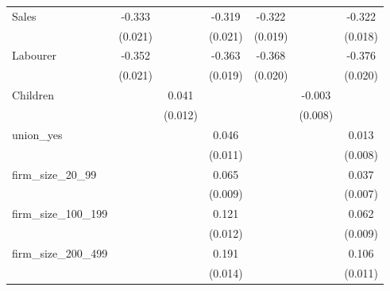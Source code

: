 {\begin{tabular}{l*{6}{c}}
Sales               &      -0.333\sym{***}&                     &      -0.319\sym{***}&      -0.322\sym{***}&                     &      -0.322\sym{***}\\
                    &     (0.021)         &                     &     (0.021)         &     (0.019)         &                     &     (0.018)         \\
Labourer            &      -0.352\sym{***}&                     &      -0.363\sym{***}&      -0.368\sym{***}&                     &      -0.376\sym{***}\\
                    &     (0.021)         &                     &     (0.019)         &     (0.020)         &                     &     (0.020)         \\
Children            &                     &       0.041\sym{***}&                     &                     &      -0.003         &                     \\
                    &                     &     (0.012)         &                     &                     &     (0.008)         &                     \\
union\_yes           &                     &                     &       0.046\sym{***}&                     &                     &       0.013\sym{*}  \\
                    &                     &                     &     (0.011)         &                     &                     &     (0.008)         \\
firm\_size\_20\_99     &                     &                     &       0.065\sym{***}&                     &                     &       0.037\sym{***}\\
                    &                     &                     &     (0.009)         &                     &                     &     (0.007)         \\
firm\_size\_100\_199   &                     &                     &       0.121\sym{***}&                     &                     &       0.062\sym{***}\\
                    &                     &                     &     (0.012)         &                     &                     &     (0.009)         \\
firm\_size\_200\_499   &                     &                     &       0.191\sym{***}&                     &                     &       0.106\sym{***}\\
                    &                     &                     &     (0.014)         &                     &                     &     (0.011)         \\

\end{tabular}}
